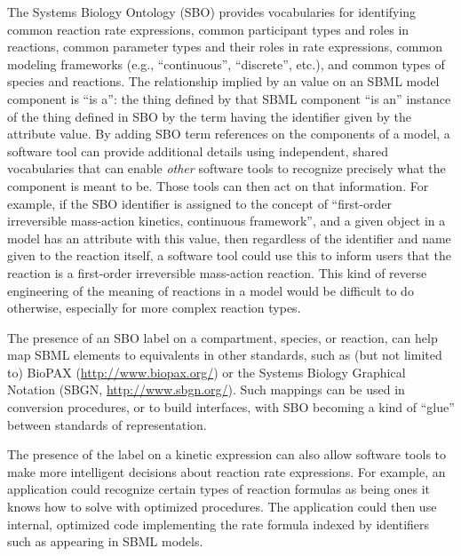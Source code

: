 The Systems Biology Ontology (SBO) provides vocabularies for
identifying common reaction rate expressions, common participant
types and roles in reactions, common parameter types and their
roles in rate expressions, common modeling frameworks (e.g.,
``continuous'', ``discrete'', etc.), and common types of
species and reactions.  The relationship implied by an
 value on an SBML model component is ``is a'': the
thing defined by that SBML component ``is an'' instance of the
thing defined in SBO by the term having the identifier given by
the  attribute value.  By adding SBO term
references on the components of a model, a software tool can
provide additional details using independent, shared vocabularies
that can enable \emph{other} software tools to recognize precisely
what the component is meant to be.  Those tools can then act on
that information.  For example, if the SBO identifier
 is assigned to the concept of ``first-order
irreversible mass-action kinetics, continuous framework'', and a
given \KineticLaw object in a model has an 
attribute with this value, then regardless of the
identifier and name given to the reaction itself, a software tool
could use this to inform users that the reaction is a first-order
irreversible mass-action reaction.  This kind of reverse
engineering of the meaning of reactions in a model would be
difficult to do otherwise, especially for more complex reaction
types.

The presence of an SBO label on a compartment, species, or
reaction, can help map SBML elements to equivalents in
other standards, such as (but not limited to) BioPAX
(\url{http://www.biopax.org/}) or the Systems Biology Graphical
Notation (SBGN, \url{http://www.sbgn.org/}).  Such mappings can be
used in conversion procedures, or to build interfaces, with SBO
becoming a kind of ``glue'' between standards of representation.

The presence of the label on a kinetic expression can also allow
software tools to make more intelligent decisions about reaction
rate expressions.  For example, an application could recognize
certain types of reaction formulas as being ones it
knows how to solve with optimized procedures.  The application
could then use internal, optimized code implementing the rate
formula indexed by identifiers such as 
appearing in SBML models.

